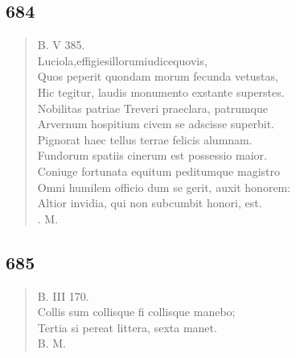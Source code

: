 \documentclass[11pt, a4paper]{report}
\begin{document}
            \subsection*{684}
      \begin{verse}
      B. V 385. \\ Luciola,effigiesillorumiudicequovis, \\ Quos peperit quondam morum fecunda vetustas, \\ Hic tegitur, laudis monumento exstante superstes. \\ Nobilitas patriae Treveri praeclara, patrumque \\ Arvernum hospitium civem se adscisse superbit. \\ Pignorat haec tellus terrae felicis alumnam. \\ Fundorum spatiis cinerum est possessio maior. \\ Coniuge fortunata equitum peditumque magistro \\ Omni humilem officio dum se gerit, auxit honorem: \\ Altior invidia, qui non subcumbit honori, est. \\ . M. \\ 
      \end{verse}
  
            \subsection*{685}
      \begin{verse}
      B. III 170. \\ Collis sum collisque fi collisque manebo; \\ Tertia si pereat littera, sexta manet. \\ B. M. \\ 
      \end{verse}
  
\end{document}
